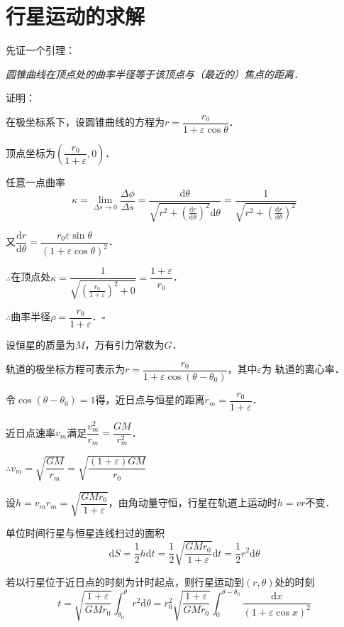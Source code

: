 \documentclass[UTF8,fontset=none,linespread=1.2]{ctexart}
\newcommand{\upd}{\mathrm{d}}
\begin{document}
\section*{行星运动的求解}
\noindent 先证一个引理：

\textit{圆锥曲线在顶点处的曲率半径等于该顶点与（最近的）焦点的距离．}

\noindent 证明：

在极坐标系下，设圆锥曲线的方程为$r=\dfrac{r_0}{1+\varepsilon\cos\theta}$．

顶点坐标为$\left(\dfrac{r_0}{1+\varepsilon},0\right)$．

任意一点曲率$$\kappa=\lim_{\Delta s\to 0}\dfrac{\Delta\phi}{\Delta s}
=\dfrac{\upd\theta}{\sqrt{r^2+\left(\frac{\upd r}{\upd\theta}\right)^2}\upd\theta}
=\dfrac{1}{\sqrt{r^2+\left(\frac{\upd r}{\upd\theta}\right)^2}}$$

又$\dfrac{\upd r}{\upd\theta}=\dfrac{r_0\varepsilon\sin\theta}{(1+\varepsilon\cos\theta)^2}$．

$\therefore$在顶点处$\kappa=\dfrac{1}{\sqrt{\left(\frac{r_0}{1+\varepsilon}\right)^2+0}}=\dfrac{1+\varepsilon}{r_0}$．

$\therefore$曲率半径$\rho=\dfrac{r_0}{1+\varepsilon}$．\hfill$\square$

\vspace{4ex}
设恒星的质量为$M$，万有引力常数为$G$．

轨道的极坐标方程可表示为$r=\dfrac{r_0}{1+\varepsilon\cos(\theta-\theta_0)}$，其中$\varepsilon$为
轨道的离心率．

令$\cos(\theta-\theta_0)=1$得，近日点与恒星的距离$r_m=\dfrac{r_0}{1+\varepsilon}$．

近日点速率$v_m$满足$\dfrac{v_m^2}{r_m}=\dfrac{GM}{r_m^2}$．

$\therefore v_m=\sqrt{\dfrac{GM}{r_m}}=\sqrt{\dfrac{(1+\varepsilon)GM}{r_0}}$

设$h=v_mr_m=\sqrt{\dfrac{GMr_0}{1+\varepsilon}}$，由角动量守恒，行星在轨道上运动时$h=vr$不变．

单位时间行星与恒星连线扫过的面积$$\upd S=\dfrac12h\upd t=\dfrac12\sqrt{\dfrac{GMr_0}{1+\varepsilon}}\upd t=\dfrac12r^2\upd\theta$$

若以行星位于近日点的时刻为计时起点，则行星运动到$(r,\theta)$处的时刻$$t=\sqrt{\dfrac{1+\varepsilon}{GMr_0}}\int_{\theta_0}^{\theta}r^2\upd \theta=r_0^2\sqrt{\dfrac{1+\varepsilon}{GMr_0}}\int_0^{\theta-\theta_0}\dfrac{\upd x}{(1+\varepsilon\cos x)^2}$$
\end{document}

